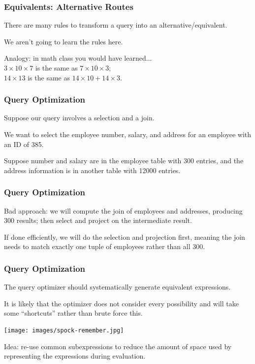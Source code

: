 \begin{frame}
\frametitle{Equivalents: Alternative Routes}

There are many rules to transform a query into an alternative/equivalent.

We aren't going to learn the rules here.

Analogy: in math class you would have learned...\\
\quad $3 \times 10 \times 7$ is the same as $7 \times 10 \times 3$;\\
\quad $14 \times 13$ is the same as $14 \times 10 + 14 \times 3$.


\end{frame}



\begin{frame}
\frametitle{Query Optimization}

Suppose our query involves a selection and a join. 

We want to select the employee number, salary, and address for an employee with an ID of 385. 

Suppose number and salary are in the employee table with 300 entries, and the address information is in another table with 12000 entries. 

\end{frame}

\begin{frame}
\frametitle{Query Optimization}


Bad approach: we will compute the join of employees and addresses, producing 300 results; then select and project on the intermediate result.

If done efficiently, we will do the selection and projection first, meaning the join needs to match exactly one tuple of employees rather than all 300. 

\end{frame}

\begin{frame}
\frametitle{Query Optimization}
The query optimizer should systematically generate equivalent expressions. 

It is likely that the optimizer does not consider every possibility and will take some ``shortcuts'' rather than brute force this. 


\begin{center}
	\texttt{[image: images/spock-remember.jpg]}
\end{center}

Idea: re-use common subexpressions to reduce the amount of space used by representing the expressions during evaluation.

\end{frame}

